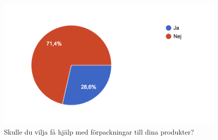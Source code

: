 \documentclass[10pt,a4paper,oneside]{article}
\begin{document}
\begin{figure}
	\includegraphics[scale=0.6]{14.png}
	\caption{Skulle du vilja f\r{a} hj\"alp med f\"orpackningar till dina produkter?}
\end{figure}
\end{document}
